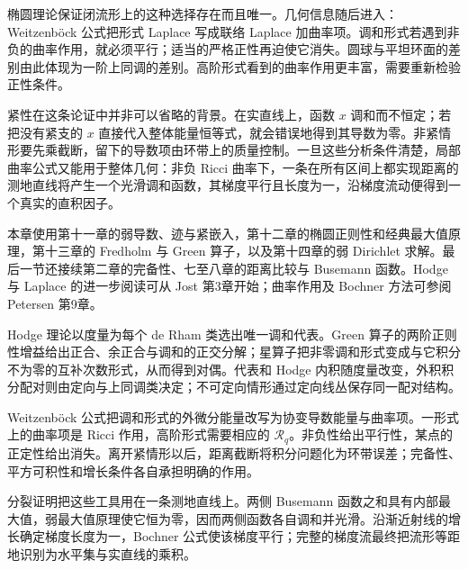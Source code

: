 \ProseParagraphBreak

椭圆理论保证闭流形上的这种选择存在而且唯一。几何信息随后进入：Weitzenböck 公式把形式 Laplace 写成联络 Laplace 加曲率项。调和形式若遇到非负的曲率作用，就必须平行；适当的严格正性再迫使它消失。圆球与平坦环面的差别由此体现为一阶上同调的差别。高阶形式看到的曲率作用更丰富，需要重新检验正性条件。

\ProseParagraphBreak

紧性在这条论证中并非可以省略的背景。在实直线上，函数 \(x\) 调和而不恒定；若把没有紧支的 \(x\) 直接代入整体能量恒等式，就会错误地得到其导数为零。非紧情形要先乘截断，留下的导数项由环带上的质量控制。一旦这些分析条件清楚，局部曲率公式又能用于整体几何：非负 Ricci 曲率下，一条在所有区间上都实现距离的测地直线将产生一个光滑调和函数，其梯度平行且长度为一，沿梯度流动便得到一个真实的直积因子。

\ProseParagraphBreak

本章使用第十一章的弱导数、迹与紧嵌入，第十二章的椭圆正则性和经典最大值原理，第十三章的 Fredholm 与 Green 算子，以及第十四章的弱 Dirichlet 求解。最后一节还接续第二章的完备性、七至八章的距离比较与 Busemann 函数。Hodge 与 Laplace 的进一步阅读可从 Jost 第3章\cite[第3章]{Jost2017}开始；曲率作用及 Bochner 方法可参阅 Petersen 第9章\cite[第9章]{Petersen2016}。







\begin{chaptersummary}
	Hodge 理论以度量为每个 de Rham 类选出唯一调和代表。Green 算子的两阶正则性增益给出正合、余正合与调和的正交分解；星算子把非零调和形式变成与它积分不为零的互补次数形式，从而得到对偶。代表和 Hodge 内积随度量改变，外积积分配对则由定向与上同调类决定；不可定向情形通过定向线丛保存同一配对结构。

	\ProseParagraphBreak

	Weitzenböck 公式把调和形式的外微分能量改写为协变导数能量与曲率项。一形式上的曲率项是 Ricci 作用，高阶形式需要相应的 \(\mathcal R_q\)。非负性给出平行性，某点的正定性给出消失。离开紧情形以后，距离截断将积分问题化为环带误差；完备性、平方可积性和增长条件各自承担明确的作用。

	\ProseParagraphBreak

	分裂证明把这些工具用在一条测地直线上。两侧 Busemann 函数之和具有内部最大值，弱最大值原理使它恒为零，因而两侧函数各自调和并光滑。沿渐近射线的增长确定梯度长度为一，Bochner 公式使该梯度平行；完整的梯度流最终把流形等距地识别为水平集与实直线的乘积。
\end{chaptersummary}

